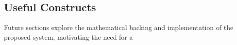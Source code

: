 \subsection{Useful Constructs}

Future sections explore the mathematical backing and implementation of the proposed system, motivating the need for a 